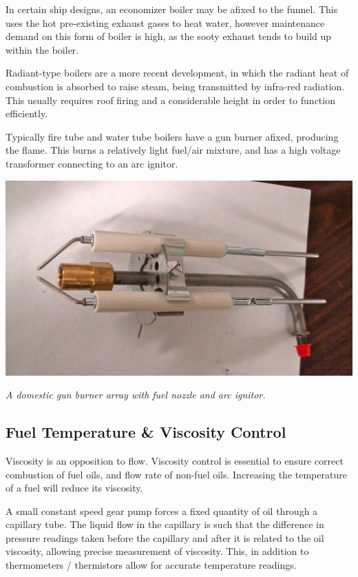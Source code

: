 \documentclass[11pt,a4paper]{article}
\begin{document}
In certain ship designs, an economizer boiler may be afixed to the funnel. This uses the hot pre-existing exhaust gases to heat water, however maintenance demand on this form of boiler is high, as the sooty exhaust tends to build up within the boiler.

Radiant-type boilers are a more recent development, in which the radiant heat of combustion is absorbed to raise steam, being transmitted by infra-red radiation. This usually requires roof firing and a considerable height in order to function efficiently.

Typically fire tube and water tube boilers have a gun burner afixed, producing the flame. This burns a relatively light fuel/air mixture, and has a high voltage transformer connecting to an arc ignitor.
\begin{center}
\includegraphics[width=\textwidth]{gunburner.jpg}\par
\textit{A domestic gun burner array with fuel nozzle and arc ignitor.}
\end{center}
\subsection{Fuel Temperature \& Viscosity Control}
Viscosity is an opposition to flow. Viscosity control is essential to ensure correct combustion of fuel oils, and flow rate of non-fuel oils. Increasing the temperature of a fuel will reduce its viscosity.

A small constant speed gear pump forces a fixed quantity of oil through a capillary tube. The liquid flow in the capillary is such that the difference in pressure readings taken before the capillary and after it is related to the oil viscosity, allowing precise measurement of viscosity. This, in addition to thermometers / thermistors allow for accurate temperature readings.
\end{document}
